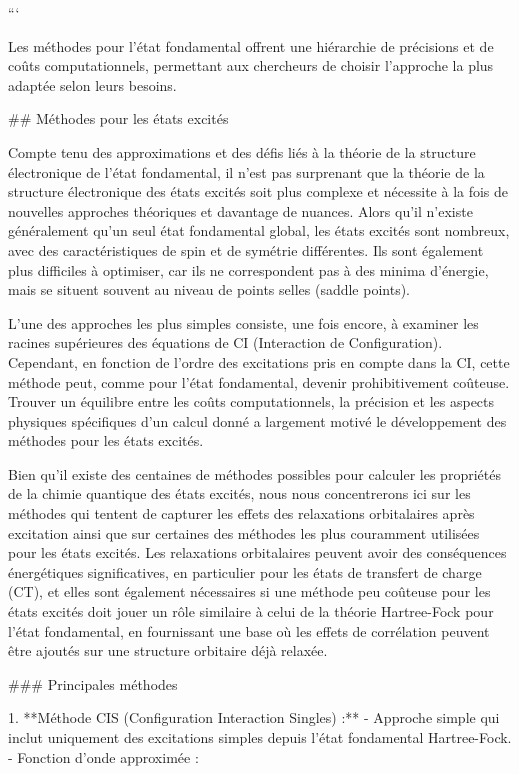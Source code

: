 \documentclass[12pt,a4paper]{report}
\begin{document}
\begin{markdown}
\begin{tikzpicture}[
    mybox/.style={draw=black, thick, fill=blue!10, rounded corners, inner sep=10pt},
    title/.style={font=\bfseries}
]
\end{tikzpicture}

```

Les méthodes pour l’état fondamental offrent une hiérarchie de précisions et de coûts computationnels, permettant aux chercheurs de choisir l’approche la plus adaptée selon leurs besoins. 


##  Méthodes pour les états excités

Compte tenu des approximations et des défis liés à la théorie de la structure électronique de l'état fondamental, il n'est pas surprenant que la théorie de la structure électronique des états excités soit plus complexe et nécessite à la fois de nouvelles approches théoriques et davantage de nuances. Alors qu'il n'existe généralement qu'un seul état fondamental global, les états excités sont nombreux, avec des caractéristiques de spin et de symétrie différentes. Ils sont également plus difficiles à optimiser, car ils ne correspondent pas à des minima d'énergie, mais se situent souvent au niveau de points selles (saddle points). 

L'une des approches les plus simples consiste, une fois encore, à examiner les racines supérieures des équations de CI (Interaction de Configuration). Cependant, en fonction de l'ordre des excitations pris en compte dans la CI, cette méthode peut, comme pour l'état fondamental, devenir prohibitivement coûteuse. Trouver un équilibre entre les coûts computationnels, la précision et les aspects physiques spécifiques d'un calcul donné a largement motivé le développement des méthodes pour les états excités. 

Bien qu'il existe des centaines de méthodes possibles pour calculer les propriétés de la chimie quantique des états excités, nous nous concentrerons ici sur les méthodes qui tentent de capturer les effets des relaxations orbitalaires après excitation ainsi que sur certaines des méthodes les plus couramment utilisées pour les états excités. Les relaxations orbitalaires peuvent avoir des conséquences énergétiques significatives, en particulier pour les états de transfert de charge (CT), et elles sont également nécessaires si une méthode peu coûteuse pour les états excités doit jouer un rôle similaire à celui de la théorie Hartree-Fock pour l'état fondamental, en fournissant une base où les effets de corrélation peuvent être ajoutés sur une structure orbitaire déjà relaxée.

### Principales méthodes

1. **Méthode CIS (Configuration Interaction Singles) :**
   - Approche simple qui inclut uniquement des excitations simples depuis l’état fondamental Hartree-Fock.
   - Fonction d’onde approximée :


\end{markdown}
\end{document}
